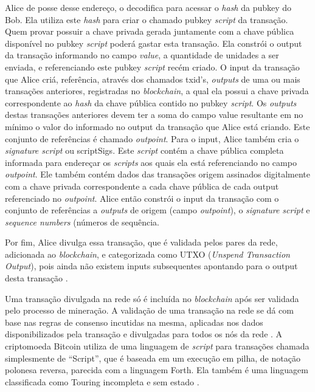 \documentclass[
	article,			%
	11pt,				%
	oneside,			%
	a4paper,			%
	chapter=TITLE,		%
	section=TITLE,		%
	subsection=TITLE,	%
	subsubsection=TITLE, %
	english,			%
	brazil,				%
	sumario=tradicional
	]{ifrs-artigo-abntex2}
\begin{document}
Alice de posse desse endereço, o decodifica para acessar o \textit{hash} da pubkey do Bob. Ela utiliza este \textit{hash} para criar o chamado pubkey \textit{script} da transação. Quem provar possuir a chave privada gerada juntamente com a chave pública disponível no pubkey \textit{script} poderá gastar esta transação. Ela constrói o output da transação informando no campo \textit{value}, a quantidade de unidades a ser enviada, e referenciando este pubkey \textit{script} recém criado.
O input da transação que Alice criá, referência, através dos chamados txid’s, \textit{outputs} de uma ou mais transações anteriores, registradas no \textit{blockchain}, a qual ela possui a chave privada correspondente ao \textit{hash} da chave pública contido no pubkey \textit{script}. Os \textit{outputs} destas transações anteriores devem ter a soma do campo value resultante em no mínimo o valor do informado no output da transação que Alice está criando. Este conjunto de referências é chamado \textit{outpoint}.
Para o input, Alice também cria o \textit{signature script} ou scriptSigs. Este \textit{script} contém a chave pública completa informada para endereçar os \textit{scripts} aos quais ela está referenciando no campo \textit{outpoint}. Ele também contém dados das transações origem assinados digitalmente com a chave privada correspondente a cada chave pública de cada output referenciado no \textit{outpoint}.
Alice então constrói o input da transação com o conjunto de referências a \textit{outputs} de origem (campo \textit{outpoint}), o \textit{signature script} e \textit{sequence numbers} (números de sequência.

Por fim, Alice divulga essa transação, que é validada pelos pares da rede, adicionada ao \textit{blockchain}, e categorizada como UTXO (\textit{Unspend Transaction Output}), pois ainda não existem inputs subsequentes apontando para o output desta transação \cite{bitcoinDev}.

Uma transação divulgada na rede só é incluída no \textit{blockchain} após ser validada pelo processo de mineração. A validação de uma transação na rede se dá com base nas regras de consenso incutidas na mesma, aplicadas nos dados disponibilizados pela transação e divulgadas para todos os nós da rede \cite{masterBit}.
A criptomoeda Bitcoin utiliza de uma linguagem de \textit{script} para transações chamada simplesmente de “Script”, que é baseada em um execução em pilha, de notação polonesa reversa, parecida com a linguagem Forth. Ela também é uma linguagem classificada como Touring incompleta e sem estado \cite{masterBit}.
\end{document}

